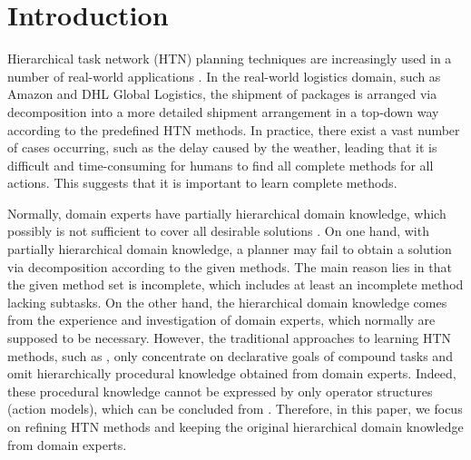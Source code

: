 \documentclass[letterpaper]{article} %
\begin{document}
\section{Introduction}
Hierarchical task network (HTN) planning techniques \cite{erol1994htn} are increasingly used in a number of real-world applications \cite{lin2008web,DBLP:journals/aicom/BehnkeSKBSDDMGB19}.
In the real-world logistics domain, such as Amazon and DHL Global Logistics, the shipment of packages is arranged via decomposition into a more detailed shipment arrangement in a top-down way according to the predefined HTN methods.
In practice, there exist a vast number of cases occurring, such as the delay caused by the weather, leading that it is difficult and time-consuming for humans to find all complete methods for all actions.
This suggests that it is important to learn complete methods. %

Normally, domain experts have partially hierarchical domain knowledge, which possibly is not sufficient to cover all desirable solutions \cite{kambhampati1998hybrid}.
On one hand, with partially hierarchical domain knowledge, a planner may fail to obtain a solution via decomposition according to the given methods.
The main reason lies in that the given method set is incomplete, which includes at least an incomplete method lacking subtasks.
On the other hand, the hierarchical domain knowledge comes from the experience and investigation of domain experts, which normally are supposed to be necessary.
However, the traditional approaches to learning HTN methods, such as \cite{DBLP:conf/aaai/HoggMK08}, only concentrate on declarative goals of compound tasks and omit hierarchically procedural knowledge obtained from domain experts.%
Indeed, these procedural knowledge cannot be expressed by only operator structures (action models),
which can be concluded from \cite{Goldman09,holler2014language}.
Therefore, in this paper, we focus on refining HTN methods and keeping the original hierarchical domain knowledge from domain experts.
\end{document}
